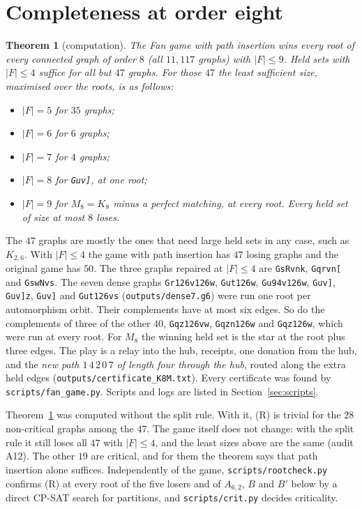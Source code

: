 \documentclass[11pt]{amsart}
\newtheorem{theorem}{Theorem}[section]
\theoremstyle{definition}
\begin{document}
\section{Completeness at order eight}\label{sec:eight}

\begin{theorem}[computation]\label{thm:complete8}
The Fan game with path insertion wins every root of every connected graph of order $8$ (all
$11{,}117$ graphs) with $|F|\le9$. Held sets with $|F|\le4$ suffice for all but $47$ graphs.
For those $47$ the least sufficient size, maximised over the roots, is as follows:
\begin{itemize}
\item $|F|=5$ for $35$ graphs;
\item $|F|=6$ for $6$ graphs;
\item $|F|=7$ for $4$ graphs;
\item $|F|=8$ for \texttt{Guv]}, at one root;
\item $|F|=9$ for $M_8=K_8$ minus a perfect matching, at every root. Every held set of size at most
$8$ loses.
\end{itemize}
\end{theorem}

The $47$ graphs are mostly the ones that need large held sets in any case, such as $K_{2,6}$. With
$|F|\le4$ the game with path insertion has $47$ losing graphs and the original game has $50$. The
three graphs repaired at $|F|\le4$ are \texttt{GsRvnk}, \texttt{Gqrvn[} and \texttt{GswNvs}. The
seven dense graphs \texttt{Gr\char126v\char126w}, \texttt{Gut\char126w},
\texttt{Gu\char94v\char126w}, \texttt{Guv]}, \texttt{Guv]z},
\texttt{Guv]} and \texttt{Gut\char126vs} (\texttt{outputs/dense7.g6}) were run one
root per automorphism orbit. Their complements have at most six edges. So do the complements of
three of the other $40$, \texttt{Gqz\char126vw}, \texttt{Gqzn\char126w} and
\texttt{Gqz\char126w}, which were run at every root.
For $M_8$ the winning held set is the star at the root plus three edges. The play is a relay into
the hub, receipts, one donation from the hub, and the \emph{new path $1\,4\,2\,0\,7$ of length
four through the hub}, routed along the extra held edges (\texttt{outputs/certificate\_K8M.txt}).
Every certificate was found by \texttt{scripts/fan\_game.py}. Scripts and logs are listed in
Section~\ref{sec:scripts}.

Theorem~\ref{thm:complete8} was computed without the split rule. With it, (R) is trivial for the
$28$ non-critical graphs among the $47$. The game itself does not change: with the split rule it
still loses all $47$ with $|F|\le4$, and the least sizes above are the same (audit A12). The other
$19$ are critical, and for them the theorem says that path insertion alone suffices. Independently
of the game, \texttt{scripts/rootcheck.py} confirms (R) at every root of the five losers and of
$A_{6,2}$, $B$ and $B'$ below by a direct CP-SAT search for partitions, and \texttt{scripts/crit.py}
decides criticality.
\end{document}

